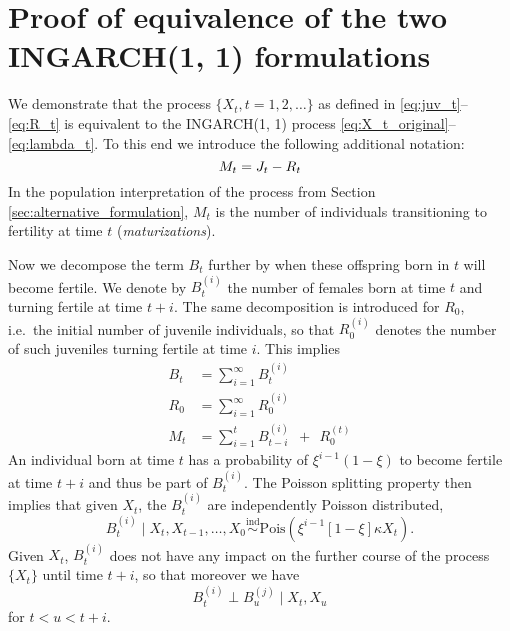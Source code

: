 \documentclass[10pt,a4paper]{article}
\begin{document}
\appendix
\section{Proof of equivalence of the two INGARCH(1, 1) formulations}
\label{appendix:proof}

We demonstrate that the process $\{X_t, t = 1, 2, \dots\}$ as defined in \eqref{eq:juv_t}--\eqref{eq:R_t} is equivalent to the INGARCH(1, 1) process \eqref{eq:X_t_original}--\eqref{eq:lambda_t}. To this end we introduce the following additional notation:
$$
M_t = J_t - R_t
$$
In the population interpretation of the process from Section \ref{sec:alternative_formulation}, $M_t$ is the number of individuals transitioning to fertility at time $t$ (\textit{maturizations}). 

Now we decompose the term $B_t$ further by when these offspring born in $t$ will become fertile. We denote by $B_t^{(i)}$ the number of females born at time $t$ and turning fertile at time $t + i$. The same decomposition is introduced for $R_0$, i.e.\ the initial number of juvenile individuals, so that $R^{(i)}_0$ denotes the number of such juveniles turning fertile at time $i$. This implies
\begin{align*}
B_t & = \sum_{i = 1}^\infty B_t^{(i)}\\
R_0 & = \sum_{i = 1}^\infty R_0^{(i)}\\
M_t & = \sum_{i = 1}^{t} B_{t - i}^{(i)} \ \ + \ \ R_0^{(t)}
\end{align*}
An individual born at time $t$ has a probability of $\xi^{i - 1}(1 - \xi)$ to become fertile at time $t + i$ and thus be part of $B_t^{(i)}$. The Poisson splitting property \cite{Kingman1993} then implies that given $X_t$, the $B_t^{(i)}$ are independently Poisson distributed,
$$
B_t^{(i)} \mid X_t, X_{t - 1}, \dots, X_0 \stackrel{\text{ind}}{\sim} \text{Pois}(\xi^{i - 1}[1 - \xi]\kappa X_t). %
$$
Given $X_t$, $B_t^{(i)}$ does not have any impact on the further course of the process $\{X_t\}$ until time $t + i$, so that moreover we have
$$
B_t^{(i)} \perp B_u^{(j)} \mid X_t, X_u
$$
for $t < u < t + i$.
\end{document}
